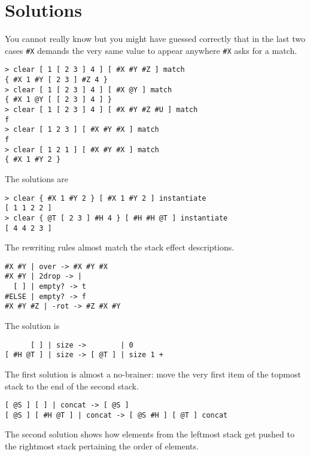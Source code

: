 \newpage
\section{Solutions}

You cannot really know but you might have guessed correctly that in the last two cases \verb|#X| demands the very same value to appear anywhere \verb|#X| asks for a match.

\begin{verbatim}
> clear [ 1 [ 2 3 ] 4 ] [ #X #Y #Z ] match
{ #X 1 #Y [ 2 3 ] #Z 4 }
> clear [ 1 [ 2 3 ] 4 ] [ #X @Y ] match
{ #X 1 @Y [ [ 2 3 ] 4 ] }
> clear [ 1 [ 2 3 ] 4 ] [ #X #Y #Z #U ] match
f
> clear [ 1 2 3 ] [ #X #Y #X ] match
f
> clear [ 1 2 1 ] [ #X #Y #X ] match
{ #X 1 #Y 2 }
\end{verbatim}

The solutions are

\begin{verbatim}
> clear { #X 1 #Y 2 } [ #X 1 #Y 2 ] instantiate
[ 1 1 2 2 ]
> clear { @T [ 2 3 ] #H 4 } [ #H #H @T ] instantiate
[ 4 4 2 3 ]
\end{verbatim}

The rewriting rules almost match the stack effect descriptions.

\begin{verbatim}
#X #Y | over -> #X #Y #X
#X #Y | 2drop -> |
  [ ] | empty? -> t
#ELSE | empty? -> f
#X #Y #Z | -rot -> #Z #X #Y
\end{verbatim}

The solution is

\begin{verbatim}
      [ ] | size ->        | 0
[ #H @T ] | size -> [ @T ] | size 1 +
\end{verbatim}


The first solution is almost a no-brainer: move the very first item of the topmost stack to the end of the second stack.

\begin{verbatim}
[ @S ] [ ] | concat -> [ @S ]
[ @S ] [ #H @T ] | concat -> [ @S #H ] [ @T ] concat
\end{verbatim}

The second solution shows how elements from the leftmost stack get pushed to the rightmost stack pertaining the order of elements.

